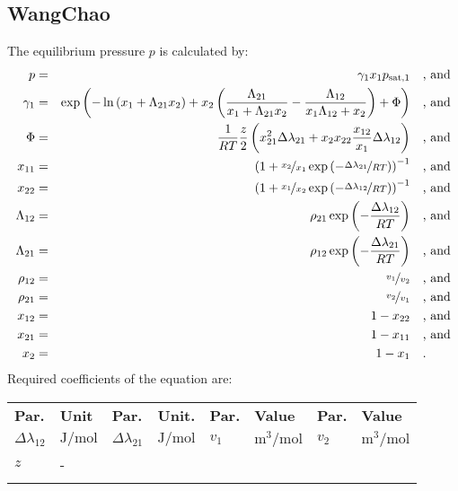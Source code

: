 \subsection{WangChao}
\label{cha:approaches:abs:act:wang_chao}
%
The equilibrium pressure $p$ is calculated by:
%
\begin{equation*}
	\begin{split}
		p &=& \gamma_1 x_1 p_\mathrm{sat,1} & \quad\text{, and} \\
		\gamma_1 &=& \exp \left( - \ln \left( x_1 + \Lambda_{21} x_2 \right) + x_2 \left( \frac{\Lambda_{21}}{x_1 + \Lambda_{21} x_2} - \frac{\Lambda_{12}}{x_1 \Lambda_{12} + x_2} \right) + \Phi \right) & \quad\text{, and} \\
		\Phi &=& \frac{1}{R T} \frac{z}{2} \left( x_{21}^2 \Delta\lambda_{21} + x_2 x_{22} \frac{x_{12}}{x_1} \Delta\lambda_{12} \right) & \quad\text{, and} \\
		x_{11} &=& \left( 1 + \nicefrac{x_2}{x_1} \exp \left( - \nicefrac{\Delta\lambda_{21}}{R T} \right) \right) ^ {-1} & \quad\text{, and} \\
		x_{22} &=& \left( 1 + \nicefrac{x_1}{x_2} \exp \left( - \nicefrac{\Delta\lambda_{12}}{R T} \right) \right) ^ {-1} & \quad\text{, and} \\
		\Lambda_{12} &=& \rho_{21} \exp \left( - \frac{\Delta\lambda_{12}}{R T} \right) & \quad\text{, and} \\
		\Lambda_{21} &=& \rho_{12} \exp \left( - \frac{\Delta\lambda_{21}}{R T} \right) & \quad\text{, and} \\
		\rho_{12} &=& \nicefrac{v_1}{v_2} & \quad\text{, and} \\
		\rho_{21} &=& \nicefrac{v_2}{v_1} & \quad\text{, and} \\
		x_{12} &=& 1 - x_{22} & \quad\text{, and} \\
		x_{21} &=& 1 - x_{11} & \quad\text{, and} \\
		x_2 &=& 1 - x_1  & \quad\text{.} \\
	\end{split}
\end{equation*}
%
Required coefficients of the equation are:
%
\begin{longtable}[l]{ll|ll|ll|ll}
\toprule
\addlinespace
\textbf{Par.} & \textbf{Unit} & \textbf{Par.} &	\textbf{Unit.} & \textbf{Par.} & \textbf{Value} & \textbf{Par.} & \textbf{Value} \\
\addlinespace
\midrule
\endhead

\bottomrule
\endfoot
\bottomrule
\endlastfoot
\addlinespace

$\Delta\lambda_{12}$ & $\si{\joule\per\mole}$ &$\Delta\lambda_{21}$ & $\si{\joule\per\mole}$ & $v_1$ & $\si{\cubic\meter\per\mole}$& $v_2$ & $\si{\cubic\meter\per\mole}$ \\
$z$ & - & & & & & & \\

\addlinespace
\end{longtable}
